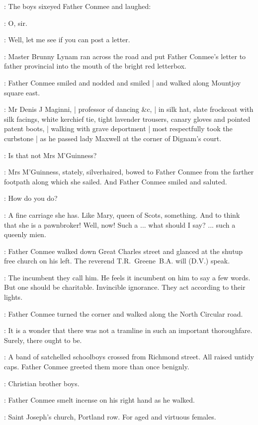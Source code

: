 :
The boys sixeyed Father Conmee and laughed:

\Boys:
O, sir.

\conmee:
Well, let me see if you can post a letter.

:
Master Brunny Lynam ran across the road
and put Father Conmee's letter to father provincial
into the mouth of the bright red letterbox.

:
Father Conmee smiled and nodded and smiled |
and walked along Mountjoy square east.

:
Mr Denis J Maginni, |
professor of dancing \&c, |
in silk hat,
slate frockcoat with silk facings,
white kerchief tie,
tight lavender trousers,
canary gloves
and pointed patent boots, |
walking with grave deportment |
most respectfully took the curbstone |
as he passed lady Maxwell
at the corner of Dignam's court.

\conmeeint:
Is that not Mrs M'Guinness?

:
Mrs M'Guinness,
stately, silverhaired,
bowed to Father Conmee from the farther footpath
along which she sailed.
And Father Conmee smiled and saluted.

\conmee:
How do you do?

\conmeeint:
A fine carriage she has.
Like Mary, queen of Scots, something.
And to think that she is a pawnbroker!
Well, now!
Such a ...
what should I say? ...
such a queenly mien.

:
Father Conmee walked down Great Charles street
and glanced at the shutup free church on his left.
The reverend T.R.~Greene~B.A. will (D.V.) speak.

\conmeeint:
The incumbent they call him.
He feels it incumbent on him to say a few words.
But one should be charitable.
Invincible ignorance.
They act according to their lights.

:
Father Conmee turned the corner
and walked along the North Circular road.

\conmeeint:
It is a wonder that there was not a tramline
in such an important thoroughfare.
Surely, there ought to be.

:
A band of satchelled schoolboys crossed from Richmond street.
All raised untidy caps.
Father Conmee greeted them more than once benignly.

\conmeeint:
Christian brother boys.

:
Father Conmee smelt incense on his right hand as he walked.

\conmeeint:
Saint Joseph's church, Portland row.
For aged and virtuous females.

